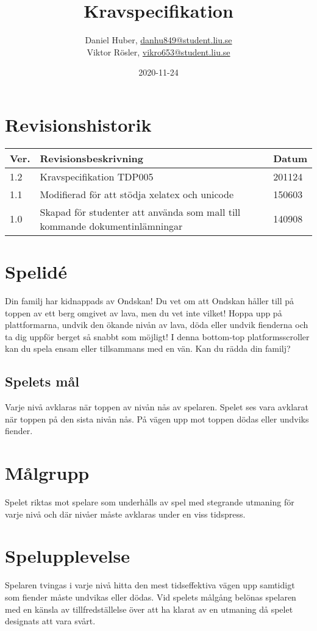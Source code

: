\documentclass{TDP005mall}
\author{Daniel Huber, \url{danhu849@student.liu.se}\\
  Viktor Rösler, \url{vikro653@student.liu.se}}
\title{Kravspecifikation}
\date{2020-11-24}
\begin{document}
\projectpage
\tableofcontents
\newpage
\section{Revisionshistorik}
\begin{table}[!h]
\begin{tabularx}{\linewidth}{|l|X|l|}
\hline
  Ver. & Revisionsbeskrivning & Datum \\\hline
1.2 & Kravspecifikation TDP005 & 201124 \\\hline
1.1 & Modifierad för att stödja xelatex och unicode & 150603 \\\hline
1.0 & Skapad för studenter att använda som mall till
kommande dokumentinlämningar & 140908 \\\hline
\end{tabularx}
\end{table}


\section{Spelid\'{e} }
Din familj har kidnappads av Ondskan! Du vet om att Ondskan håller till på toppen av ett berg omgivet av lava, men du vet inte vilket! Hoppa upp på plattformarna, undvik den ökande nivån av lava, döda eller undvik fienderna och ta dig uppför berget så snabbt som möjligt! I denna bottom-top platformsscroller kan du spela ensam eller tillsammans med en vän. Kan du rädda din familj? 

\subsection{Spelets mål}
Varje nivå avklaras när toppen av nivån nås av spelaren. Spelet ses vara avklarat när toppen på den sista nivån nås. På vägen upp mot toppen dödas eller undviks fiender. 

\section{Målgrupp}%
Spelet riktas mot spelare som underhålls av spel med stegrande utmaning för varje nivå och där nivåer måste avklaras under en viss tidspress. 

\section{Spelupplevelse}%
Spelaren tvingas i varje nivå hitta den mest tidseffektiva vägen upp samtidigt som fiender måste undvikas eller dödas. Vid spelets målgång belönas spelaren med en känsla av tillfredställelse över att ha klarat av en utmaning då spelet designats att vara svårt.
\end{document}
